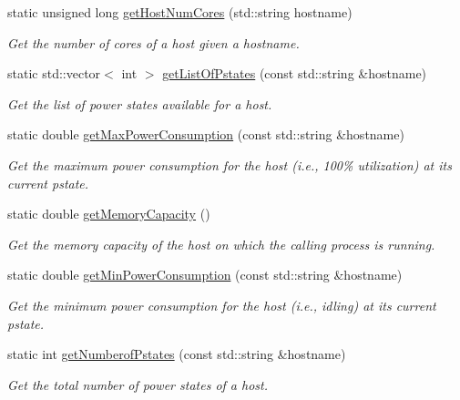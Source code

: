 \begin{DoxyCompactItemize}
static unsigned long \hyperlink{classwrench_1_1_simulation_a6f0f556690d10d683a61acc3f10f5521}{get\+Host\+Num\+Cores} (std\+::string hostname)
\begin{DoxyCompactList}\small\item\em Get the number of cores of a host given a hostname. \end{DoxyCompactList}\item 
static std\+::vector$<$ int $>$ \hyperlink{classwrench_1_1_simulation_abb75fd040236995186d9ad45434fe069}{get\+List\+Of\+Pstates} (const std\+::string \&hostname)
\begin{DoxyCompactList}\small\item\em Get the list of power states available for a host. \end{DoxyCompactList}\item 
static double \hyperlink{classwrench_1_1_simulation_ae76b92ce868c6e6c1683377d869a5b34}{get\+Max\+Power\+Consumption} (const std\+::string \&hostname)
\begin{DoxyCompactList}\small\item\em Get the maximum power consumption for the host (i.\+e., 100\% utilization) at its current pstate. \end{DoxyCompactList}\item 
static double \hyperlink{classwrench_1_1_simulation_ac0a5ca7331875bc551fc2cf1896e9dd4}{get\+Memory\+Capacity} ()
\begin{DoxyCompactList}\small\item\em Get the memory capacity of the host on which the calling process is running. \end{DoxyCompactList}\item 
static double \hyperlink{classwrench_1_1_simulation_afdf2ae84f6b3c8b51c5189199bebb52e}{get\+Min\+Power\+Consumption} (const std\+::string \&hostname)
\begin{DoxyCompactList}\small\item\em Get the minimum power consumption for the host (i.\+e., idling) at its current pstate. \end{DoxyCompactList}\item 
static int \hyperlink{classwrench_1_1_simulation_a5e8d5b963d2278c79b49a0ed7db2b933}{get\+Numberof\+Pstates} (const std\+::string \&hostname)
\begin{DoxyCompactList}\small\item\em Get the total number of power states of a host. \end{DoxyCompactList}\item 

\end{DoxyCompactItemize}

